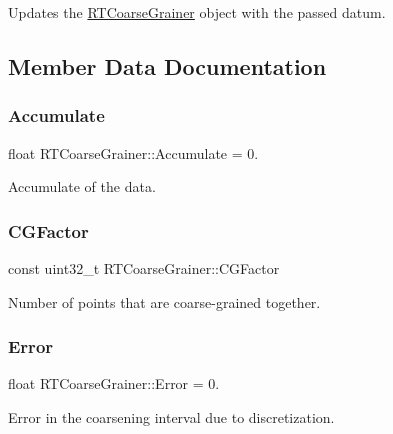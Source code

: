 Updates the {\ttfamily \hyperlink{classRTCoarseGrainer}{R\+T\+Coarse\+Grainer}} object with the passed datum. 



\subsection{Member Data Documentation}
\mbox{\label{classRTCoarseGrainer_a7912b13e79da3e88b1ea1c4067be7e08}} 
\subsubsection{\texorpdfstring{Accumulate}{Accumulate}}
{\footnotesize\ttfamily float R\+T\+Coarse\+Grainer\+::\+Accumulate = 0.}



Accumulate of the data. 

\mbox{\label{classRTCoarseGrainer_a99dc7fa0624717d9ec0a3b1786dfb89a}} 
\subsubsection{\texorpdfstring{C\+G\+Factor}{CGFactor}}
{\footnotesize\ttfamily const uint32\+\_\+t R\+T\+Coarse\+Grainer\+::\+C\+G\+Factor}



Number of points that are coarse-\/grained together. 

\mbox{\label{classRTCoarseGrainer_a80a8cf362112f12a0f7acbeabf2477b2}} 
\subsubsection{\texorpdfstring{Error}{Error}}
{\footnotesize\ttfamily float R\+T\+Coarse\+Grainer\+::\+Error = 0.}



Error in the coarsening interval due to discretization. 

